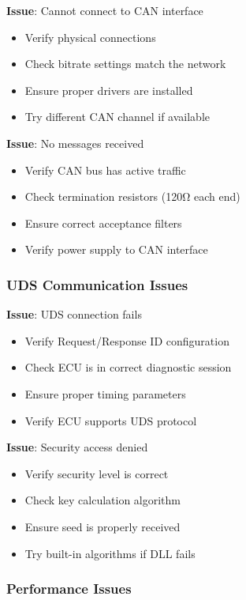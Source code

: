 \documentclass[11pt,a4paper]{article}
\begin{document}
\textbf{Issue}: Cannot connect to CAN interface
\begin{itemize}
    \item Verify physical connections
    \item Check bitrate settings match the network
    \item Ensure proper drivers are installed
    \item Try different CAN channel if available
\end{itemize}

\textbf{Issue}: No messages received
\begin{itemize}
    \item Verify CAN bus has active traffic
    \item Check termination resistors (120Ω each end)
    \item Ensure correct acceptance filters
    \item Verify power supply to CAN interface
\end{itemize}

\subsubsection{UDS Communication Issues}

\textbf{Issue}: UDS connection fails
\begin{itemize}
    \item Verify Request/Response ID configuration
    \item Check ECU is in correct diagnostic session
    \item Ensure proper timing parameters
    \item Verify ECU supports UDS protocol
\end{itemize}

\textbf{Issue}: Security access denied
\begin{itemize}
    \item Verify security level is correct
    \item Check key calculation algorithm
    \item Ensure seed is properly received
    \item Try built-in algorithms if DLL fails
\end{itemize}

\subsubsection{Performance Issues}
\end{document}
